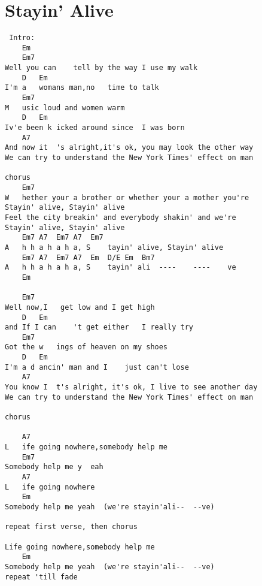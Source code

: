 \documentclass[leqno]{memoir}
\begin{document}
\chapter{Stayin' Alive}
\begin{verbatim}
 Intro:
    Em
    Em7
Well you can    tell by the way I use my walk
    D   Em
I'm a   womans man,no   time to talk
    Em7
M   usic loud and women warm
    D   Em
Iv'e been k icked around since  I was born
    A7
And now it  's alright,it's ok, you may look the other way
We can try to understand the New York Times' effect on man

chorus
    Em7
W   hether your a brother or whether your a mother you're
Stayin' alive, Stayin' alive
Feel the city breakin' and everybody shakin' and we're
Stayin' alive, Stayin' alive
    Em7 A7  Em7 A7  Em7
A   h h a h a h a, S    tayin' alive, Stayin' alive
    Em7 A7  Em7 A7  Em  D/E Em  Bm7
A   h h a h a h a, S    tayin' ali  ----    ----    ve
    Em

    Em7
Well now,I   get low and I get high
    D   Em
and If I can    't get either   I really try
    Em7
Got the w   ings of heaven on my shoes
    D   Em
I'm a d ancin' man and I    just can't lose
    A7
You know I  t's alright, it's ok, I live to see another day
We can try to understand the New York Times' effect on man

chorus

    A7
L   ife going nowhere,somebody help me
    Em7
Somebody help me y  eah
    A7
L   ife going nowhere
    Em
Somebody help me yeah  (we're stayin'ali--  --ve) 

repeat first verse, then chorus

Life going nowhere,somebody help me
    Em
Somebody help me yeah  (we're stayin'ali--  --ve) 
repeat 'till fade

\end{verbatim}
\newpage
\end{document}

